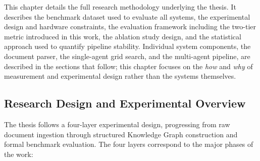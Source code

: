 ﻿\documentclass[11pt]{article}
\begin{document}
This chapter details the full research methodology underlying the thesis.
It describes the benchmark dataset used to evaluate all systems, the experimental
design and hardware constraints, the evaluation framework including the
two-tier metric introduced in this work, the ablation study design, and the
statistical approach used to quantify pipeline stability.
Individual system components, the document parser, the single-agent grid
search, and the multi-agent pipeline, are described in the sections that follow;
this chapter focuses on the \emph{how} and \emph{why} of measurement and
experimental design rather than the systems themselves.

\subsection{Research Design and Experimental Overview}
\label{sec:research_design}

The thesis follows a four-layer experimental design, progressing from raw
document ingestion through structured Knowledge Graph construction and formal
benchmark evaluation.
The four layers correspond to the major phases of the work:
\end{document}
